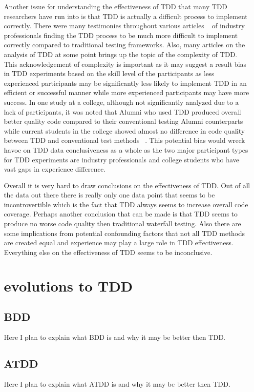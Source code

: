 \documentclass{sig-alternate}
\begin{document}
Another issue for understanding the effectiveness of TDD that many TDD researchers have run into is that TDD is actually a difficult process to implement correctly.  There were many testimonies throughout various articles ~\cite{Hammond:2012, Hellman:2012, Kettunen:2010} of industry professionals finding the TDD process to be much more difficult to implement correctly compared to traditional testing frameworks.  Also, many articles on the analysis of TDD at some point brings up the topic of the complexity of TDD. This acknowledgement of complexity is important as it may suggest a result bias in TDD experiments based on the skill level of the participants as less experienced participants may be significantly less likely to implement TDD in an efficient or successful manner while more experienced participants may have more success.  In one study at a college, although not significantly analyzed due to a lack of participants, it was noted that Alumni who used TDD produced overall better quality code compared to their conventional testing Alumni counterparts while current students in the college showed almost no difference in code quality between TDD and conventional test methods ~\cite{Lemos:2012}.  This potential bias would wreck havoc on TDD data conclusiveness as a whole as the two major participant types for TDD experiments are industry professionals and college students who have vast gaps in experience difference.

Overall it is very hard to draw conclusions on the effectiveness of TDD. Out of all the data out there there is really only one data point that seems to be incontrovertible which is the fact that TDD always seems to increase overall code coverage.  Perhaps another conclusion that can be made is that TDD seems to produce no worse code quality then traditional waterfall testing.  Also there are some implications from potential confounding factors that not all TDD methods are created equal and experience may play a large role in TDD effectiveness. Everything else on the effectiveness of TDD seems to be inconclusive.
\section{evolutions to TDD}
\subsection{BDD}
Here I plan to explain what BDD is and why it may be better then TDD.

\subsection{ATDD}
Here I plan to explain what ATDD is and why it may be better then TDD.
\end{document}
